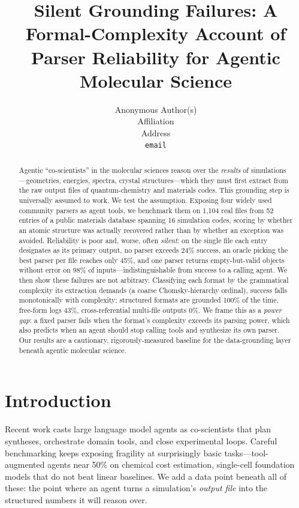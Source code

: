 \documentclass{article}
\title{Silent Grounding Failures: A Formal-Complexity Account of\\
Parser Reliability for Agentic Molecular Science}
\author{%
  Anonymous Author(s)\\
  Affiliation\\
  Address\\
  \texttt{email}\\
}
\begin{document}
\maketitle

\begin{abstract}
Agentic ``co-scientists'' in the molecular sciences reason over the \emph{results}
of simulations---geometries, energies, spectra, crystal structures---which they
must first extract from the raw output files of quantum-chemistry and
materials codes. This grounding step is universally assumed to work. We test the
assumption. Exposing four widely used community parsers as agent tools, we
benchmark them on 1{,}104 real files from 52 entries of a public materials
database spanning 16 simulation codes, scoring by whether an atomic structure was
actually recovered rather than by whether an exception was avoided. Reliability
is poor and, worse, often \emph{silent}: on the single file each entry designates
as its primary output, no parser exceeds 24\% success, an oracle picking the best
parser per file reaches only 45\%, and one parser returns empty-but-valid objects
without error on 98\% of inputs---indistinguishable from success to a calling
agent. We then show these failures are not arbitrary. Classifying each format by
the grammatical complexity its extraction demands (a coarse Chomsky-hierarchy
ordinal), success falls monotonically with complexity: structured formats are
grounded 100\% of the time, free-form logs 43\%, cross-referential multi-file
outputs 0\%. We frame this as a \emph{power gap}: a fixed parser fails when the
format's complexity exceeds its parsing power, which also predicts when an
agent should stop calling tools and synthesize its own parser. Our results are a
cautionary, rigorously-measured baseline for the data-grounding layer beneath
agentic molecular science.
\end{abstract}

\section{Introduction}

Recent work casts large language model agents as co-scientists that plan
syntheses, orchestrate domain tools, and close experimental loops. Careful
benchmarking keeps exposing fragility at surprisingly basic tasks---tool-augmented
agents near 50\% on chemical cost estimation, single-cell foundation models that
do not beat linear baselines. We add a data point beneath all of these: the point
where an agent turns a simulation's \emph{output file} into the structured numbers
it will reason over.
\end{document}
